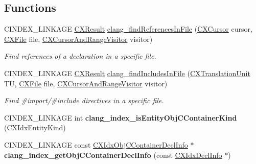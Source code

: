 \subsection*{Functions}
\begin{DoxyCompactItemize}
\item 
C\+I\+N\+D\+E\+X\+\_\+\+L\+I\+N\+K\+A\+GE \mbox{\hyperlink{group__CINDEX__HIGH_ga59185777d9788da5d983cc0c7c8977bf}{C\+X\+Result}} \mbox{\hyperlink{group__CINDEX__HIGH_gaa8524d179bc3668d215d326d332df97b}{clang\+\_\+find\+References\+In\+File}} (\mbox{\hyperlink{structCXCursor}{C\+X\+Cursor}} cursor, \mbox{\hyperlink{group__CINDEX__FILES_gacfcea9c1239c916597e2e5b3e109215a}{C\+X\+File}} file, \mbox{\hyperlink{structCXCursorAndRangeVisitor}{C\+X\+Cursor\+And\+Range\+Visitor}} visitor)
\begin{DoxyCompactList}\small\item\em Find references of a declaration in a specific file. \end{DoxyCompactList}\item 
C\+I\+N\+D\+E\+X\+\_\+\+L\+I\+N\+K\+A\+GE \mbox{\hyperlink{group__CINDEX__HIGH_ga59185777d9788da5d983cc0c7c8977bf}{C\+X\+Result}} \mbox{\hyperlink{group__CINDEX__HIGH_ga1c3e49cda9a6e2f9c6930881755e0605}{clang\+\_\+find\+Includes\+In\+File}} (\mbox{\hyperlink{group__CINDEX_gacdb7815736ca709ce9a5e1ec2b7e16ac}{C\+X\+Translation\+Unit}} TU, \mbox{\hyperlink{group__CINDEX__FILES_gacfcea9c1239c916597e2e5b3e109215a}{C\+X\+File}} file, \mbox{\hyperlink{structCXCursorAndRangeVisitor}{C\+X\+Cursor\+And\+Range\+Visitor}} visitor)
\begin{DoxyCompactList}\small\item\em Find \#import/\#include directives in a specific file. \end{DoxyCompactList}\item 
\mbox{\label{group__CINDEX__HIGH_gacd31bd2c96a08c185a4d6f63d1133649}} 
C\+I\+N\+D\+E\+X\+\_\+\+L\+I\+N\+K\+A\+GE int {\bfseries clang\+\_\+index\+\_\+is\+Entity\+Obj\+C\+Container\+Kind} (C\+X\+Idx\+Entity\+Kind)
\item 
\mbox{\label{group__CINDEX__HIGH_ga78117833cbb1378e373097b4288b8937}} 
C\+I\+N\+D\+E\+X\+\_\+\+L\+I\+N\+K\+A\+GE const \mbox{\hyperlink{structCXIdxObjCContainerDeclInfo}{C\+X\+Idx\+Obj\+C\+Container\+Decl\+Info}} $\ast$ {\bfseries clang\+\_\+index\+\_\+get\+Obj\+C\+Container\+Decl\+Info} (const \mbox{\hyperlink{structCXIdxDeclInfo}{C\+X\+Idx\+Decl\+Info}} $\ast$)

\end{DoxyCompactItemize}
